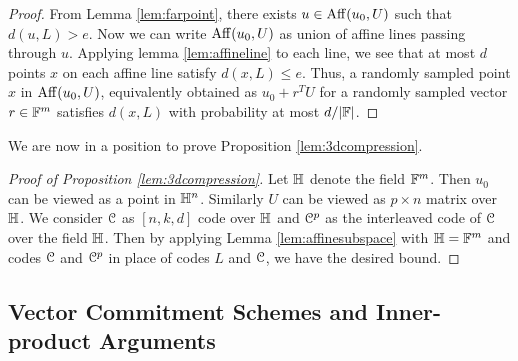 \begin{proof}
	From Lemma \ref{lem:farpoint}, there exists $u\in {\rm Aff}({u_0},{U})$ such that $d(u,L)>e$. Now we can write ${\rm Aff}({u_0},{U})$ as union of affine lines passing through $u$. Applying lemma \ref{lem:affineline} to each line, we see that at most $d$ points $x$ on each affine line satisfy $d(x,L)\leq e$. Thus, a randomly sampled point $x$ in ${\rm Aff}({u_0},{U})$, equivalently obtained as $u_0+r^TU$ for a randomly sampled vector $r\in \mathbb{F}^m$ satisfies $d(x,L)$ with probability at most $d/|\mathbb{F}|$.
\end{proof}
We are now in a position to prove Proposition \ref{lem:3dcompression}.
\begin{proof}[Proof of Proposition \ref{lem:3dcompression}]
	Let $\mathbb{H}$ denote the field $\mathbb{F}^m$. Then $u_0$ can be viewed as a point in
	$\mathbb{H}^n$. Similarly $U$ can be viewed as $p\times n$ matrix over $\mathbb{H}$.
	We consider $\mathcal{C}$ as $[n,k,d]$ code over $\mathbb{H}$ and $\mathcal{C}^p$ as the
	interleaved code of $\mathcal{C}$ over the field $\mathbb{H}$. Then by applying Lemma \ref{lem:affinesubspace}
	with $\mathbb{H}=\mathbb{F}^m$ and codes $\mathcal{C}$ and $\mathcal{C}^p$ in place of codes $L$ and	$\mathcal{C}$, we have the desired bound.
\end{proof}

\subsection{Vector Commitment Schemes and Inner-product Arguments}


